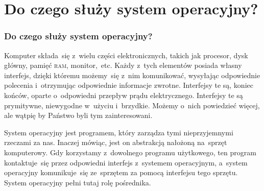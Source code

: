 \documentclass[10pt,t]{beamer}
\begin{document}
\section{Do czego służy system operacyjny?}


\begin{frame}
  \frametitle{Do czego służy system operacyjny?}


  Komputer składa~się z~wielu części elektronicznych, takich jak procesor,
  dysk główny, pamięć \textsc{ram}, monitor,~etc. Każdy z~tych elementów
  posiada własny interfejs, dzięki któremu możemy~się z~nim komunikować,
  wysyłając odpowiednie polecenia i~otrzymując odpowiednie informacje
  zwrotne. Interfejsy te są, koniec końców, oparte o~odpowiedni przepływ
  prądu elektrycznego. Interfejsy te są prymitywne, niewygodne w~użyciu
  i~brzydkie. Możemy o~nich powiedzieć więcej, ale wątpię by Państwo byli
  tym zainteresowani.

  System operacyjny jest programem, który zarządza tymi nieprzyjemnymi
  rzeczami za nas. Inaczej mówiąc, jest on abstrakcją nałożoną na~sprzęt
  komputerowy. Gdy korzystamy z~dowolnego programu użytkowego, ten program
  kontaktuje~się przez odpowiedni interfejs z~systemem operacyjnym,
  a~system operacyjny komunikuje~się ze~sprzętem za pomocą interfejsu tego
  sprzętu. System operacyjny pełni tutaj rolę pośrednika.

\end{frame}
\end{document}
